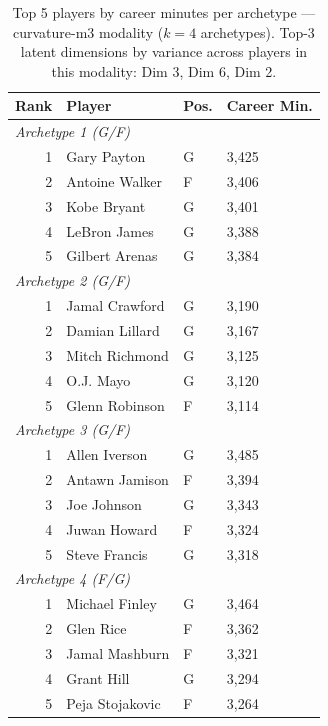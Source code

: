 \begin{table}[htbp]
  \centering\small
  \begin{tabular}{rlll}
    \toprule
    Rank & Player & Pos. & Career Min. \\
    \midrule
    \multicolumn{4}{l}{\textit{Archetype 1 (G/F)}} \\
    \midrule
    1 & Gary Payton & G & 3,425 \\
    2 & Antoine Walker & F & 3,406 \\
    3 & Kobe Bryant & G & 3,401 \\
    4 & LeBron James & G & 3,388 \\
    5 & Gilbert Arenas & G & 3,384 \\
    \midrule[0.4pt]
    \multicolumn{4}{l}{\textit{Archetype 2 (G/F)}} \\
    \midrule
    1 & Jamal Crawford & G & 3,190 \\
    2 & Damian Lillard & G & 3,167 \\
    3 & Mitch Richmond & G & 3,125 \\
    4 & O.J. Mayo & G & 3,120 \\
    5 & Glenn Robinson & F & 3,114 \\
    \midrule[0.4pt]
    \multicolumn{4}{l}{\textit{Archetype 3 (G/F)}} \\
    \midrule
    1 & Allen Iverson & G & 3,485 \\
    2 & Antawn Jamison & F & 3,394 \\
    3 & Joe Johnson & G & 3,343 \\
    4 & Juwan Howard & F & 3,324 \\
    5 & Steve Francis & G & 3,318 \\
    \midrule[0.4pt]
    \multicolumn{4}{l}{\textit{Archetype 4 (F/G)}} \\
    \midrule
    1 & Michael Finley & G & 3,464 \\
    2 & Glen Rice & F & 3,362 \\
    3 & Jamal Mashburn & F & 3,321 \\
    4 & Grant Hill & G & 3,294 \\
    5 & Peja Stojakovic & F & 3,264 \\
    \bottomrule
  \end{tabular}
  \caption{Top 5 players by career minutes per archetype --- curvature-m3 modality ($k=4$ archetypes). Top-3 latent dimensions by variance across players in this modality: Dim 3, Dim 6, Dim 2.}
  \label{tab:arch_reps_curvature_m3}
\end{table}

